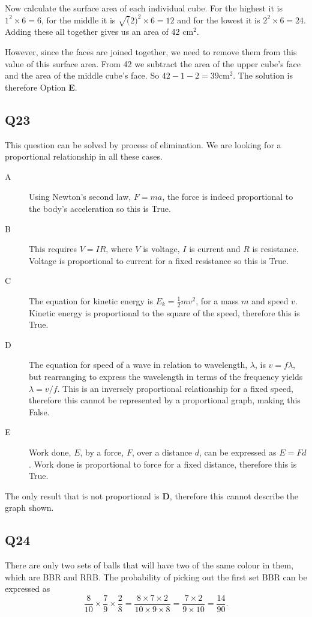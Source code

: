 \documentclass[11pt]{article}
\begin{document}
Now calculate the surface area of each individual cube.  For the highest it is $1^2 \times 6 = 6$, for the middle it is $\sqrt(2)^2 \times 6 = 12$ and for the lowest it is $2^2 \times 6 = 24$.  Adding these all together gives us an area of 42 $\mathrm{cm^2}$.  

However, since the faces are joined together, we need to remove them from this value of this surface area.  From 42 we subtract the area of the upper cube's face and the area of the middle cube's face.  So $42 - 1 - 2 = 39 \mathrm{cm^2}$.  The solution is therefore Option \textbf{E}. 




\subsection*{Q23}
This question can be solved by process of elimination.  We are looking for a proportional relationship in all these cases.
\begin{description}
\item[A] Using Newton's second law, $F=ma$, the force is indeed proportional to the body's acceleration so this is True.
\item[B] This requires $V=IR$, where $V$ is voltage, $I$ is current and $R$ is resistance.  Voltage is proportional to current for a fixed resistance so this is True.
\item[C] The equation for kinetic energy is $E_k = \frac{1}{2}mv^2$, for a mass $m$ and speed $v$.  Kinetic energy is proportional to the square of the speed, therefore this is True.
\item[D] The equation for speed of a wave in relation to wavelength, $\lambda$, is $v=f\lambda$, but rearranging to express the wavelength in terms of the frequency yields $\lambda = v / f$.  This is an inversely proportional relationship for a fixed speed, therefore this cannot be represented by a proportional graph, making this False.
\item[E] Work done, $E$, by a force, $F$, over a distance $d$, can be expressed as $E=Fd$.  Work done is proportional to force for a fixed distance, therefore this is True.
\end{description}

The only result that is not proportional is \textbf{D}, therefore this cannot describe the graph shown.

\subsection*{Q24}
There are only two sets of balls that will have two of the same colour in them, which are BBR and RRB.  The probability of picking out the first set BBR can be expressed as
\begin{equation*}
\frac{8}{10} \times \frac{7}{9} \times \frac{2}{8} = \frac{8 \times 7 \times 2}{10 \times 9 \times 8} = \frac{7 \times 2}{9 \times 10} = \frac{14}{90}.
\end{equation*} 
\end{document}

